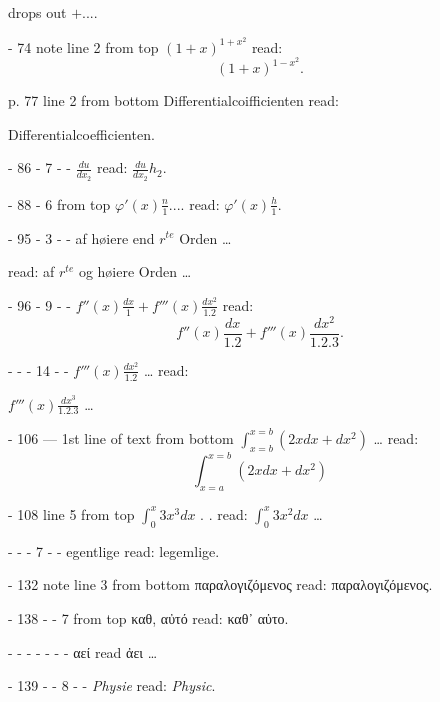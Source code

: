 \documentclass[12pt,a4paper,openany]{book}
\newcommand{\opage}[1]{\marginnote{\footnotesize\textit{[#1]}}}
\begin{document}
\noindent drops out $+ ....$

\noindent - 74 note line 2 from top $(1+x)^{1+x^{2}}$ read:
\[ (1+x)^{1-x^{2}}. \]

\opage{55}\setcounter{footnote}{0}%
p. 77 line 2 from bottom Differentialcoifficienten read:

\noindent Differentialcoefficienten.

\noindent - 86 - 7 - - $\frac{du}{dx_{2}}$ read: $\frac{du}{dx_{2}} h_{2}$.

\noindent - 88 - 6 from top $\varphi'(x)\frac{n}{1} ....$ read: $\varphi'(x)\frac{h}{1}$.

\noindent - 95 - 3 - - af høiere end $r^{te}$ Orden \dots{}

\noindent read: af $r^{te}$ og høiere Orden \dots{}

\noindent - 96 - 9 - - $f''(x)\frac{dx}{1} + f'''(x)\frac{dx^{2}}{1.2}$ read:
\[ f''(x)\frac{dx}{1.2} + f'''(x)\frac{dx^{2}}{1.2.3}. \]

\noindent - - - 14 - - $f'''(x)\frac{dx^{2}}{1.2}$ \dots{} read:

\noindent $f'''(x)\frac{dx^{3}}{1.2.3}$ \dots{}

\noindent - 106 --- 1st line of text from bottom $\int_{x=b}^{x=b}(2xdx + dx^{2})$ \dots{} read:
\[ \int_{x=a}^{x=b}(2xdx + dx^{2}) \]

\noindent - 108 line 5 from top $\int_{0}^{x} 3x^{3}dx$ . . read: $\int_{0}^{x} 3x^{2}dx$ \dots{}

\noindent - - - 7 - - egentlige read: legemlige.

\noindent - 132 note line 3 from bottom παραλογιζόμενος read: παραλογιζόμενος.

\noindent - 138 - - 7 from top καθ, αὐτό read: καθ᾽ αὐτο. 

\noindent - - - - - - - αεί  read ἀει \dots{}

\noindent - 139 - - 8 - - \textit{Physie} read: \textit{Physic}.
\end{document}
